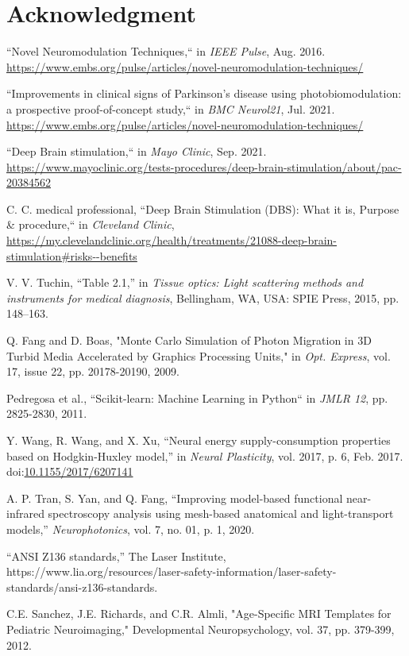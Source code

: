 \documentclass[journal,twoside,web]{ieeecolor}
\begin{document}
\section*{Acknowledgment}

\begin{thebibliography}{00}

 ``Novel Neuromodulation Techniques,`` in \emph{IEEE Pulse}, Aug. 2016. 
\url{https://www.embs.org/pulse/articles/novel-neuromodulation-techniques/} 

 ``Improvements in clinical signs of Parkinson's disease using photobiomodulation: a prospective proof-of-concept study,`` in \emph{BMC Neurol21}, Jul. 2021. 
\url{https://www.embs.org/pulse/articles/novel-neuromodulation-techniques/} 

 ``Deep Brain stimulation,`` in \emph{Mayo Clinic}, Sep. 2021. 
\url{https://www.mayoclinic.org/tests-procedures/deep-brain-stimulation/about/pac-20384562}

 C. C. medical professional, ``Deep Brain Stimulation (DBS): What it is, Purpose \& procedure,`` in \emph{Cleveland Clinic}, 
\url{https://my.clevelandclinic.org/health/treatments/21088-deep-brain-stimulation\#risks--benefits}

 V. V. Tuchin, “Table 2.1,” in \emph{Tissue optics: Light scattering methods and instruments for medical diagnosis}, 
Bellingham, WA, USA: SPIE Press, 2015, pp. 148–163. 

 Q. Fang and D. Boas, "Monte Carlo Simulation of Photon Migration in 3D Turbid Media Accelerated by Graphics Processing Units," in \emph{Opt. Express}, 
vol. 17, issue 22, pp. 20178-20190, 2009.

 Pedregosa et al., ``Scikit-learn: Machine Learning in Python`` in \emph{JMLR 12}, pp. 2825-2830, 2011.

 Y. Wang, R. Wang, and X. Xu, “Neural energy supply-consumption properties based on Hodgkin-Huxley model,” in \emph{Neural Plasticity}, 
vol. 2017, p. 6, Feb. 2017. doi:\url{10.1155/2017/6207141} 

 A. P. Tran, S. Yan, and Q. Fang, “Improving model-based functional near-infrared spectroscopy analysis using mesh-based anatomical and light-transport models,” \emph{Neurophotonics}, vol. 7, no. 01, p. 1, 2020.

 “ANSI Z136 standards,” The Laser Institute, https://www.lia.org/resources/laser-safety-information/laser-safety-standards/ansi-z136-standards.

C.E. Sanchez, J.E. Richards, and C.R. Almli, "Age-Specific MRI Templates for Pediatric Neuroimaging," Developmental Neuropsychology, vol. 37, pp. 379-399, 2012.

\end{thebibliography}
\end{document}
